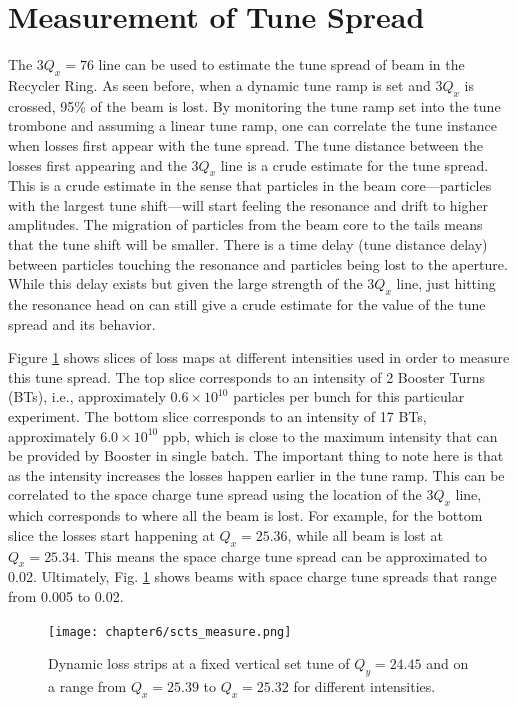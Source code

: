 \section{Measurement of Tune Spread}

The $3Q_x=76$ line can be used to estimate the tune spread of beam in the Recycler Ring. As seen before, when a dynamic tune ramp is set and $3Q_x$ is crossed, 95\% of the beam is lost. By monitoring the tune ramp set into the tune trombone and assuming a linear tune ramp, one can correlate the tune instance when losses first appear with the tune spread. The tune distance between the losses first appearing and the $3Q_x$ line is a crude estimate for the tune spread. This is a crude estimate in the sense that particles in the beam core---particles with the largest tune shift---will start feeling the resonance and drift to higher amplitudes. The migration of particles from the beam core to the tails means that the tune shift will be smaller. There is a time delay (tune distance delay) between particles touching the resonance and particles being lost to the aperture. While this delay exists but given the large strength of the $3Q_x$ line, just hitting the resonance head on can still give a crude estimate for the value of the tune spread and its behavior.

Figure \ref{fig:dynamictunespread} shows slices of loss maps at different intensities used in order to measure this tune spread. The top slice corresponds to an intensity of 2 Booster Turns (BTs), i.e., approximately $0.6\times10^{10}$ particles per bunch for this particular experiment. The bottom slice corresponds to an intensity of 17 BTs, approximately $6.0\times10^{10}$ ppb, which is close to the maximum intensity that can be provided by Booster in single batch. The important thing to note here is that as the intensity increases the losses happen earlier in the tune ramp. This can be correlated to the space charge tune spread using the location of the $3Q_x$ line, which corresponds to where all the beam is lost. For example, for the bottom slice the losses start happening at $Q_x=25.36$, while all beam is lost at $Q_x=25.34$. This means the space charge tune spread can be approximated to 0.02. Ultimately, Fig. \ref{fig:dynamictunespread} shows beams with space charge tune spreads that range from 0.005 to 0.02.

\newpage
\begin{figure}[H]
    \centering
    \texttt{[image: chapter6/scts\_measure.png]}
    \caption{Dynamic loss strips at a fixed vertical set tune of $Q_y=24.45$ and on a range from $Q_x=25.39$ to $Q_x=25.32$ for different intensities.}
    \label{fig:dynamictunespread}
\end{figure}
\newpage

